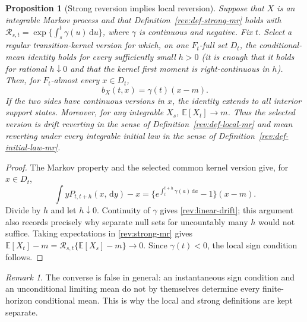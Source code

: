 \documentclass[11pt]{article}
\newtheorem{proposition}[definition]{Proposition}
\theoremstyle{remark}
\newtheorem{remark}[definition]{Remark}
\newcommand{\E}{\mathbb E}
\newcommand{\dd}{\,\mathrm d}
\begin{document}
\begin{proposition}[Strong reversion implies local reversion]
\label{rev:prop-strong-local}
Suppose that $X$ is an integrable Markov process and that
Definition~\ref{rev:def-strong-mr} holds with
$\mathcal R_{s,t}=\exp\{\int_s^t\gamma(u)\dd u\}$, where $\gamma$ is continuous and
negative.  Fix $t$.  Select a regular transition-kernel version for which,
on one $F_t$-full set $D_t$, the conditional-mean identity holds for every
sufficiently small $h>0$ (it is enough that it holds for rational $h\downarrow0$
and that the kernel first moment is right-continuous in $h$).  Then, for
$F_t$-almost every $x\in D_t$,
\begin{equation}
b_X(t,x)=\gamma(t)(x-m).
\label{rev:linear-drift}
\end{equation}
If the two sides have continuous versions in $x$, the identity extends to all
interior support states.  Moreover, for any integrable $X_s$,
  $\E[X_t]\to m$.  Thus the selected version is drift reverting in the sense of
  Definition~\ref{rev:def-local-mr} and mean reverting under every integrable
  initial law in the sense of Definition~\ref{rev:def-initial-law-mr}.
\end{proposition}

\begin{proof}
The Markov property and the selected common kernel version give, for
$x\in D_t$,
\[
 \int yP_{t,t+h}(x,\dd y)-x
 =\{e^{\int_t^{t+h}\gamma(a)\dd a}-1\}(x-m).
\]
Divide by $h$ and let $h\downarrow0$.  Continuity of $\gamma$ gives
\eqref{rev:linear-drift}; this argument also records precisely why separate
null sets for uncountably many $h$ would not suffice.  Taking expectations in
\eqref{rev:strong-mr} gives
$\E[X_t]-m=\mathcal R_{s,t}\{\E[X_s]-m\}\to0$.
Since $\gamma(t)<0$, the local sign condition follows.
\end{proof}

\begin{remark}
The converse is false in general: an instantaneous sign condition and an
unconditional limiting mean do not by themselves determine every finite-horizon
conditional mean.  This is why the local and strong definitions are kept
separate.
\end{remark}
\end{document}
